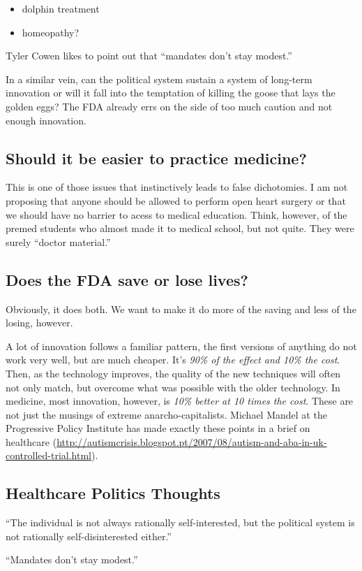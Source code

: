 \begin{itemize}
\item dolphin treatment
\item homeopathy?
\end{itemize}

Tyler Cowen likes to point out that ``mandates don't stay modest.''

In a similar vein, can the political system sustain a system of long-term
innovation or will it fall into the temptation of killing the goose that lays
the golden eggs? The FDA already errs on the side of too much caution and not
enough innovation.

\subsection{Should it be easier to practice medicine?}

This is one of those issues that instinctively leads to false dichotomies. I am
not proposing that anyone should be allowed to perform open heart surgery or
that we should have no barrier to acess to medical education. Think, however,
of the premed students who almost made it to medical school, but not quite.
They were surely ``doctor material.''

\subsection{Does the FDA save or lose lives?}

Obviously, it does both. We want to make it do more of the saving and less of
the losing, however.

A lot of innovation follows a familiar pattern, the first versions of anything
do not work very well, but are much cheaper. It's \emph{90\% of the effect and
10\% the cost}. Then, as the technology improves, the quality of the new
techniques will often not only match, but overcome what was possible with the
older technology. In medicine, most innovation, however, is \emph{10\% better
at 10 times the cost}. These are not just the musings of extreme
anarcho-capitalists. Michael Mandel at the Progressive Policy Institute has
made exactly these points in a brief on healthcare
(\url{http://autismcrisis.blogspot.pt/2007/08/autism-and-aba-in-uk-controlled-trial.html}).

\subsection{Healthcare Politics Thoughts}

``The individual is not always rationally self-interested, but the political
system is not rationally self-disinterested either.''

``Mandates don't stay modest.''
